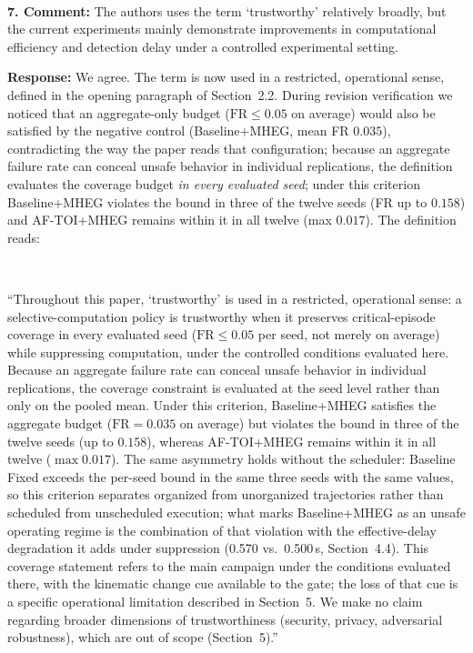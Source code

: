 \documentclass[1p,12pt,authoryear]{elsarticle}
\begin{document}
~

\noindent \textbf{7. Comment:} The authors uses the term `trustworthy' relatively broadly, but the current experiments mainly demonstrate improvements in computational efficiency and detection delay under a controlled experimental setting.

\vspace{2mm}
\noindent \textbf{Response:} We agree. The term is now used in a restricted, operational sense, defined in the opening paragraph of Section~2.2. During revision verification we noticed that an aggregate-only budget ($\mathrm{FR}\le 0.05$ on average) would also be satisfied by the negative control (Baseline+MHEG, mean FR $0.035$), contradicting the way the paper reads that configuration; because an aggregate failure rate can conceal unsafe behavior in individual replications, the definition evaluates the coverage budget \emph{in every evaluated seed}; under this criterion Baseline+MHEG violates the bound in three of the twelve seeds (FR up to $0.158$) and AF-TOI+MHEG remains within it in all twelve (max $0.017$). The definition reads:

~

``Throughout this paper, `trustworthy' is used in a restricted, operational sense: a selective-computation policy is trustworthy when it preserves critical-episode coverage in every evaluated seed ($\mathrm{FR} \le 0.05$ per seed, not merely on average) while suppressing computation, under the controlled conditions evaluated here. Because an aggregate failure rate can conceal unsafe behavior in individual replications, the coverage constraint is evaluated at the seed level rather than only on the pooled mean. Under this criterion, Baseline+MHEG satisfies the aggregate budget ($\mathrm{FR}=0.035$ on average) but violates the bound in three of the twelve seeds (up to $0.158$), whereas AF-TOI+MHEG remains within it in all twelve ($\max 0.017$). The same asymmetry holds without the scheduler: Baseline Fixed exceeds the per-seed bound in the same three seeds with the same values, so this criterion separates organized from unorganized trajectories rather than scheduled from unscheduled execution; what marks Baseline+MHEG as an unsafe operating regime is the combination of that violation with the effective-delay degradation it adds under suppression (0.570 vs.\ 0.500\,s, Section~4.4). This coverage statement refers to the main campaign under the conditions evaluated there, with the kinematic change cue available to the gate; the loss of that cue is a specific operational limitation described in Section~5. We make no claim regarding broader dimensions of trustworthiness (security, privacy, adversarial robustness), which are out of scope (Section~5).''
\end{document}

